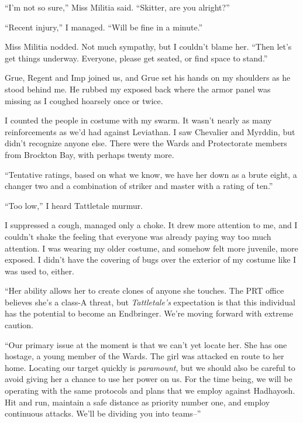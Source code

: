 ``I'm not so sure,'' Miss Militia said.  ``Skitter, are you alright?''



``Recent injury,'' I managed.  ``Will be fine in a minute.''



Miss Militia nodded.  Not much sympathy, but I couldn't blame her.  ``Then let's get things underway.  Everyone, please get seated, or find space to stand.''



Grue, Regent and Imp joined us, and Grue set his hands on my shoulders as he stood behind me.  He rubbed my exposed back where the armor panel was missing as I coughed hoarsely once or twice.



I counted the people in costume with my swarm.  It wasn't nearly as many reinforcements as we'd had against Leviathan.  I saw Chevalier and Myrddin, but didn't recognize anyone else.  There were the Wards and Protectorate members from Brockton Bay, with perhaps twenty more.



``Tentative ratings, based on what we know, we have her down as a brute eight, a changer two and a combination of striker and master with a rating of ten.''



``Too low,'' I heard Tattletale murmur.



I suppressed a cough, managed only a choke.  It drew more attention to me, and I couldn't shake the feeling that everyone was already paying way too much attention.  I was wearing my older costume, and somehow felt more juvenile, more exposed.  I didn't have the covering of bugs over the exterior of my costume like I was used to, either.



``Her ability allows her to create clones of anyone she touches.  The PRT office believes she's a class-A threat, but \emph{Tattletale's} expectation is that this individual has the potential to become an Endbringer.  We're moving forward with extreme caution.



``Our primary issue at the moment is that we can't yet locate her.  She has one hostage, a young member of the Wards.  The girl was attacked en route to her home.  Locating our target quickly is \emph{paramount}, but we should also be careful to avoid giving her a chance to use her power on us.  For the time being, we will be operating with the same protocols and plans that we employ against Hadhayosh.  Hit and run, maintain a safe distance as priority number one, and employ continuous attacks.  We'll be dividing you into teams--''



